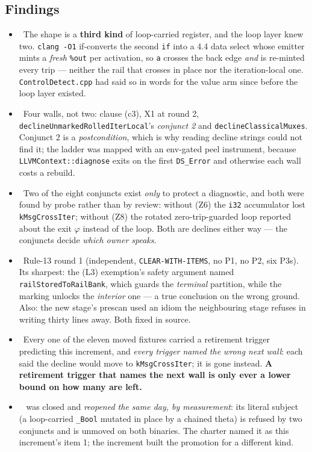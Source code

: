 \subsection*{Findings}
\begin{itemize}
  \item \foverdecline\ The shape is a \textbf{third kind} of loop-carried register, and the loop layer
        knew two. \texttt{clang -O1} if-converts the second \texttt{if} into a 4.4 data select whose
        emitter mints a \emph{fresh} \texttt{\%out} per activation, so \texttt{a} crosses the back edge
        \emph{and} is re-minted every trip --- neither the rail that crosses in place nor the
        iteration-local one. \texttt{ControlDetect.cpp} had said so in words for the value arm since
        before the loop layer existed.
  \item \foverdecline\ Four walls, not two: clause (c3), X1 at round 2,
        \texttt{declineUnmarkedRolledIterLocal}'s \emph{conjunct 2} and \texttt{declineClassicalMuxes}.
        Conjunct 2 is a \emph{postcondition}, which is why reading decline strings could not find it;
        the ladder was mapped with an env-gated peel instrument, because
        \texttt{LLVMContext::diagnose} exits on the first \texttt{DS\_Error} and otherwise each wall
        costs a rebuild.
  \item \fconfirmed\ Two of the eight conjuncts exist \emph{only} to protect a diagnostic, and both
        were found by probe rather than by review: without (Z6) the \texttt{i32} accumulator lost
        \texttt{kMsgCrossIter}; without (Z8) the rotated zero-trip-guarded loop reported about the exit
        $\varphi$ instead of the loop. Both are declines either way --- the conjuncts decide
        \emph{which owner speaks}.
  \item \fconfirmed\ Rule-13 round 1 (independent, \texttt{CLEAR-WITH-ITEMS}, no P1, no P2, six P3s).
        Its sharpest: the (L3) exemption's safety argument named \texttt{railStoredToRailBank}, which
        guards the \emph{terminal} partition, while the marking unlocks the \emph{interior} one --- a
        true conclusion on the wrong ground. Also: the new stage's prescan used an idiom the
        neighbouring stage refuses in writing thirty lines away. Both fixed in source.
  \item \fconfirmed\ Every one of the eleven moved fixtures carried a retirement trigger predicting
        this increment, and \emph{every trigger named the wrong next wall}: each said the decline would
        move to \texttt{kMsgCrossIter}; it is gone instead. \textbf{A retirement trigger that names the
        next wall is only ever a lower bound on how many are left.}
  \item \foverdecline\  was closed and \emph{reopened the same day, by measurement}: its
        literal subject (a loop-carried \texttt{\_Bool} mutated in place by a chained theta) is refused
        by two conjuncts and is unmoved on both binaries. The charter named it as this increment's
        item 1; the increment built the promotion for a different kind.
\end{itemize}

